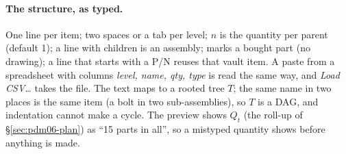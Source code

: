 \paragraph{The structure, as typed.} One line per item; two spaces or a tab per level; $n$ is the quantity per
parent (default 1); a line with children is an assembly;  marks a bought part (no drawing); a line that
starts with a P/N reuses that vault item. A paste from a spreadsheet with columns \emph{level, name, qty, type} is read
the same way, and \emph{Load CSV\ldots} takes the file. The text maps to a rooted tree $T$; the same name in two places
is the same item (a bolt in two sub-assemblies), so $T$ is a DAG, and indentation cannot make a cycle. The preview shows
$Q_t$ (the roll-up of \S\ref{sec:pdm06-plan}) as ``15 parts in all'', so a mistyped quantity shows before anything is
made.

